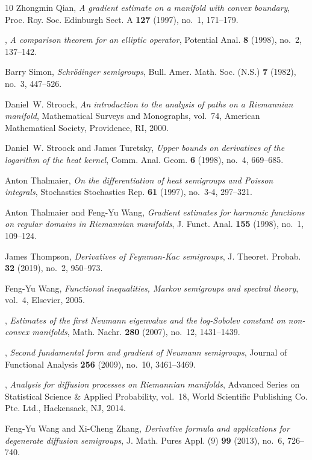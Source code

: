 \documentclass[11pt,twoside, reqno]{article}
\newcommand\1{\mathbbm{1}}
\theoremstyle{definition}
\numberwithin{equation}{section}
\begin{document}
\begin{thebibliography}{10}
Zhongmin Qian, \emph{A gradient estimate on a manifold with convex boundary},
  Proc. Roy. Soc. Edinburgh Sect. A \textbf{127} (1997), no.~1, 171--179.

\bysame, \emph{A comparison theorem for an elliptic operator}, Potential Anal.
  \textbf{8} (1998), no.~2, 137--142. 

Barry Simon, \emph{Schr\"odinger semigroups}, Bull. Amer. Math. Soc. (N.S.)
  \textbf{7} (1982), no.~3, 447--526. 

Daniel~W. Stroock, \emph{An introduction to the analysis of paths on a
  {R}iemannian manifold}, Mathematical Surveys and Monographs, vol.~74,
  American Mathematical Society, Providence, RI, 2000. 

Daniel~W. Stroock and James Turetsky, \emph{Upper bounds on derivatives of the
  logarithm of the heat kernel}, Comm. Anal. Geom. \textbf{6} (1998), no.~4,
  669--685. 

Anton Thalmaier, \emph{On the differentiation of heat semigroups and {P}oisson
  integrals}, Stochastics Stochastics Rep. \textbf{61} (1997), no.~3-4,
  297--321. 

Anton Thalmaier and Feng-Yu Wang, \emph{Gradient estimates for harmonic
  functions on regular domains in {R}iemannian manifolds}, J. Funct. Anal.
  \textbf{155} (1998), no.~1, 109--124. 

James Thompson, \emph{Derivatives of {F}eynman-{K}ac semigroups}, J. Theoret.
  Probab. \textbf{32} (2019), no.~2, 950--973. 

Feng-Yu Wang, \emph{Functional inequalities, {M}arkov semigroups and spectral
  theory}, vol.~4, Elsevier, 2005.

\bysame, \emph{Estimates of the first {N}eumann eigenvalue and the
  log-{S}obolev constant on non-convex manifolds}, Math. Nachr. \textbf{280}
  (2007), no.~12, 1431--1439. 

\bysame, \emph{{S}econd fundamental form and gradient of {N}eumann semigroups},
  Journal of Functional Analysis \textbf{256} (2009), no.~10, 3461--3469.

\bysame, \emph{Analysis for diffusion processes on {R}iemannian manifolds},
  Advanced Series on Statistical Science \& Applied Probability, vol.~18, World
  Scientific Publishing Co. Pte. Ltd., Hackensack, NJ, 2014. 

Feng-Yu Wang and Xi-Cheng Zhang, \emph{Derivative formula and applications for
  degenerate diffusion semigroups}, J. Math. Pures Appl. (9) \textbf{99}
  (2013), no.~6, 726--740. 

\end{thebibliography}
\end{document}
